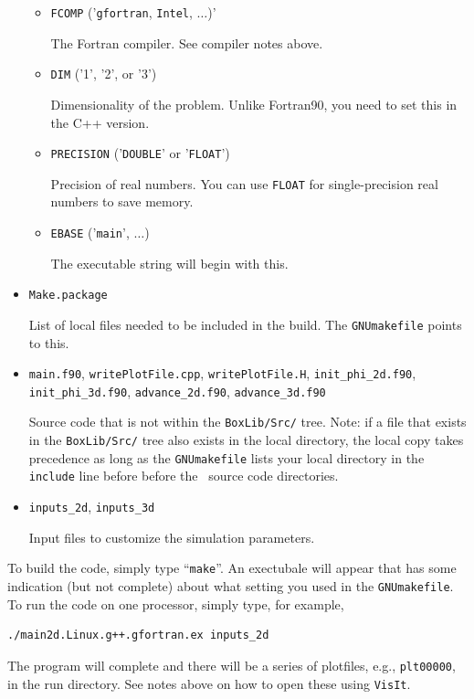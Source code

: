 \begin{itemize}
\begin{itemize}
    \item {\tt FCOMP} ('{\tt gfortran}, {\tt Intel}, $\ldots$)'

    The Fortran compiler.  See compiler notes above.

    \item {\tt DIM} ('1', '2', or '3')

    Dimensionality of the problem.  Unlike Fortran90, you need to set this in the C++ version.

    \item {\tt PRECISION} ('{\tt DOUBLE}' or '{\tt FLOAT}')

    Precision of real numbers.  You can use {\tt FLOAT} for single-precision real numbers to save memory.

    \item {\tt EBASE} ('{\tt main}', $\ldots$)

    The executable string will begin with this.

  \end{itemize}

\item {\tt Make.package}

List of local files needed to be included in the build.  The {\tt GNUmakefile} points to this.

\item {\tt main.f90}, {\tt writePlotFile.cpp}, {\tt writePlotFile.H}, {\tt init\_phi\_2d.f90},
      {\tt init\_phi\_3d.f90}, {\tt advance\_2d.f90}, {\tt advance\_3d.f90}

Source code that is not within the {\tt BoxLib/Src/} tree.  Note: if a file that exists in the
{\tt BoxLib/Src/} tree also exists in the local directory, the local copy takes precedence
as long as the {\tt GNUmakefile} lists your local directory in the {\tt include} line before
before the \BoxLib\ source code directories.

\item {\tt inputs\_2d}, {\tt inputs\_3d}

Input files to customize the simulation parameters.

\end{itemize}

To build the code, simply type ``{\tt make}''.  An exectubale will appear that has some indication (but not complete)
about what setting you used in the {\tt GNUmakefile}.  To run the code on one processor, simply type, for example,
\begin{lstlisting}[backgroundcolor=\color{light-red}]
./main2d.Linux.g++.gfortran.ex inputs_2d
\end{lstlisting}
The program will complete and there will be a series of plotfiles, e.g., {\tt plt00000}, in the run directory.  See notes above on how to open these using {\tt VisIt}.

